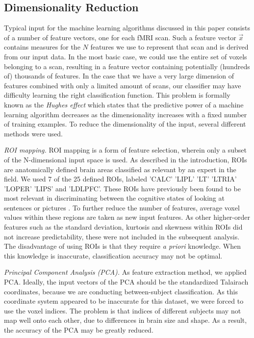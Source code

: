 \documentclass[preprint,journal,11pt]{vgtc}
\begin{document}
\subsection{Dimensionality Reduction}
\label{sec:dimensionalityReduction}
Typical input for the machine learning algorithms discussed in this paper consists of a number of feature vectors, one for each fMRI scan. Such a feature vector $\vec{x}$ contains measures for the $N$ features we use to represent that scan and is derived from our input data. In the most basic case, we could use the entire set of voxels belonging to a scan, resulting in a feature vector containing potentially (hundreds of) thousands of features.
In the case that we have a very large dimension of features combined with only a limited amount of scans, our classifier may have difficulty learning the right classification function. This problem is formally known as the \textit{Hughes effect}\cite{Hughes1054102} which states that the predictive power of a machine learning algorithm decreases as the dimensionality increases with a fixed number of training examples. To reduce the dimensionality of the input, several different methods were used.

\emph{ROI mapping.} ROI mapping is a form of feature selection, wherein only a subset of the N-dimensional input space is used. As described in the introduction, ROIs are anatomically defined brain areas classified as relevant by an expert in the field. We used 7 of the 25 defined ROIs, labeled  'CALC' 'LIPL' 'LT' 'LTRIA' 'LOPER' 'LIPS' and  'LDLPFC'. These ROIs have previously been found to be most relevant in discriminating between the cognitive states of looking at sentences or pictures \cite{wa:2003betw}. To further reduce the number of features, average voxel values within these regions are taken as new input features. As other higher-order features such as the standard deviation, kurtosis and skewness within ROIs did not increase predictability, these were not included in the subsequent analysis. The disadvantage of using ROIs is that they require \textit{a priori} knowledge. When this knowledge is inaccurate, classification accuracy may not be optimal.

\emph{Principal Component Analysis (PCA).} As feature extraction method, we applied PCA. Ideally, the input vectors of the PCA should be the standardized Talairach coordinates, because we are conducting between-subject classification. As this coordinate system appeared to be inaccurate for this dataset, we were forced to use the voxel indices. The problem is that indices of different subjects may not map well onto each other, due to differences in brain size and shape. As a result, the accuracy of the PCA may be greatly reduced.   
\end{document}
